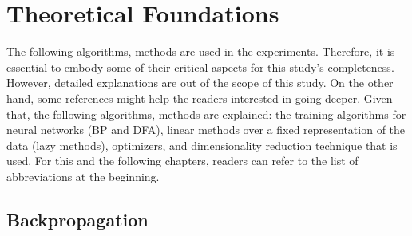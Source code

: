 \documentclass[a4paper, nobind]{templates/ociamthesis}
\begin{document}
\hypertarget{chap:chapter_1}{%
\chapter{Theoretical Foundations}\label{chap:chapter_1}}

\minitoc 
\noindent The following algorithms, methods are used in the experiments. Therefore, it is essential to embody some of their critical aspects for this study's completeness. However, detailed explanations are out of the scope of this study. On the other hand, some references might help the readers interested in going deeper. Given that, the following algorithms, methods are explained: the training algorithms for neural networks (BP and DFA), linear methods over a fixed representation of the data (lazy methods), optimizers, and dimensionality reduction technique that is used. For this and the following chapters, readers can refer to the list of abbreviations at the beginning.

\hypertarget{backpropagation}{%
\section{Backpropagation}\label{backpropagation}}
\end{document}
